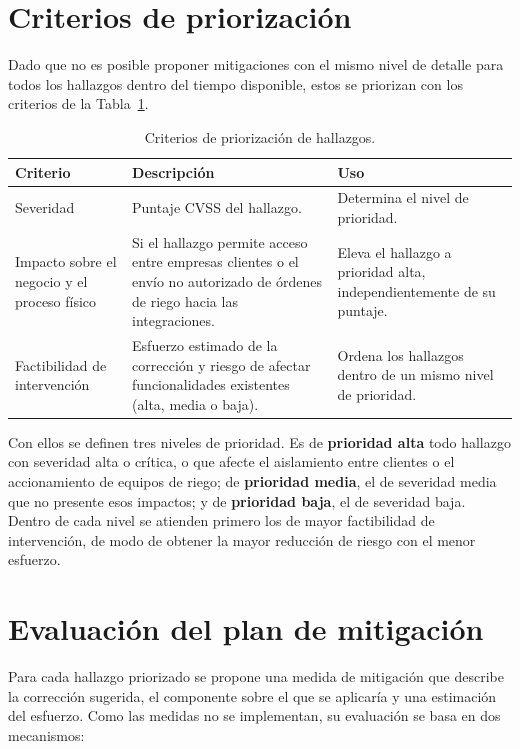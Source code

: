 \documentclass[12pt,letterpaper]{report}
\begin{document}
\section*{Criterios de priorización}

Dado que no es posible proponer mitigaciones con el mismo nivel de detalle
para todos los hallazgos dentro del tiempo disponible, estos se priorizan con
los criterios de la Tabla~\ref{tab:criterios}.

\begin{table}[htbp]
\centering
\small
\caption{Criterios de priorización de hallazgos.}
\label{tab:criterios}
\begin{tabular}{@{}p{3.2cm}p{7.5cm}p{4.8cm}@{}}
\toprule
\textbf{Criterio} & \textbf{Descripción} & \textbf{Uso} \\
\midrule
Severidad & Puntaje CVSS del hallazgo. & Determina el nivel de prioridad. \\
\addlinespace
Impacto sobre el negocio y el proceso físico &
Si el hallazgo permite acceso entre empresas clientes o el envío no autorizado
de órdenes de riego hacia las integraciones. &
Eleva el hallazgo a prioridad alta, independientemente de su puntaje. \\
\addlinespace
Factibilidad de intervención &
Esfuerzo estimado de la corrección y riesgo de afectar funcionalidades
existentes (alta, media o baja). &
Ordena los hallazgos dentro de un mismo nivel de prioridad. \\
\bottomrule
\end{tabular}
\end{table}

Con ellos se definen tres niveles de prioridad. Es de \textbf{prioridad alta}
todo hallazgo con severidad alta o crítica, o que afecte el aislamiento entre
clientes o el accionamiento de equipos de riego; de \textbf{prioridad media},
el de severidad media que no presente esos impactos; y de \textbf{prioridad
baja}, el de severidad baja. Dentro de cada nivel se atienden primero los de
mayor factibilidad de intervención, de modo de obtener la mayor reducción de
riesgo con el menor esfuerzo.

\section*{Evaluación del plan de mitigación}

Para cada hallazgo priorizado se propone una medida de mitigación que describe
la corrección sugerida, el componente sobre el que se aplicaría y una
estimación del esfuerzo. Como las medidas no se implementan, su evaluación se
basa en dos mecanismos:
\end{document}
